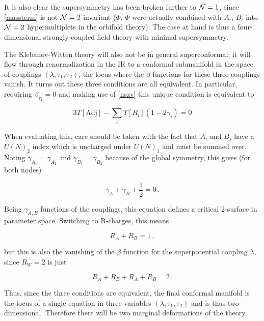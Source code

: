 It is also clear the supersymmetry has been broken further to $\mathcal{N} = 1$, since \eqref{massterm} is not $\mathcal{N} = 2$ invariant ($\Phi$, $\tilde \Phi$ were actually combined with $A_i$, $B_i$ into $\mathcal{N} = 2$ hypermultiplets in the orbifold theory). The case at hand is thus a four-dimensional strongly-coupled field theory with minimal supersymmetry.

The Klebanov-Witten theory will also not be in general superconformal; it will flow through renormalization in the IR to a conformal submanifold in the space of couplings $(\lambda,\tau_1,\tau_2)$, the locus where the $\beta$ functions for these three couplings vanish. It turns out these three conditions are all equivalent. In particular, requiring $\beta_{\tau_1} = 0$ and making use of \eqref{nszv} this unique condition is equivalent to

\begin{equation}
	3 T[\mathrm{Adj}] - \sum_i T[R_i] ( 1- 2\gamma_i) = 0
	\label{}
\end{equation}

When evaluating this, care should be taken with the fact that $A_i$ and $B_j$ have a $U(N)_2$ index which is uncharged under $U(N)_1$ and must be summed over. Noting $\gamma_{A_1} = \gamma_{A_2}$ and $\gamma_{B_1} = \gamma_{B_2}$ because of the global symmetry, this gives (for both nodes)

\begin{equation}
	\gamma_A + \gamma_B + \frac{1}{2} = 0\,.
	\label{}
\end{equation}

Being $\gamma_{A,B}$ functions of the couplings, this equation defines a critical 2-surface in parameter space. Switching to R-charges, this means

\begin{equation}
	R_A + R_B = 1\,,
	\label{}
\end{equation}

but this is also the vanishing of the $\beta$ function for the superpotential coupling $\lambda$, since $R_W = 2$ is just

\begin{equation}
	R_A + R_B + R_A + R_B = 2\,.
	\label{}
\end{equation}

Thus, since the three conditions are equivalent, the final conformal manifold is the locus of a single equation in three variables $(\lambda,\tau_1,\tau_2)$ and is thus two-dimensional. Therefore there will be two marginal deformations of the theory.


